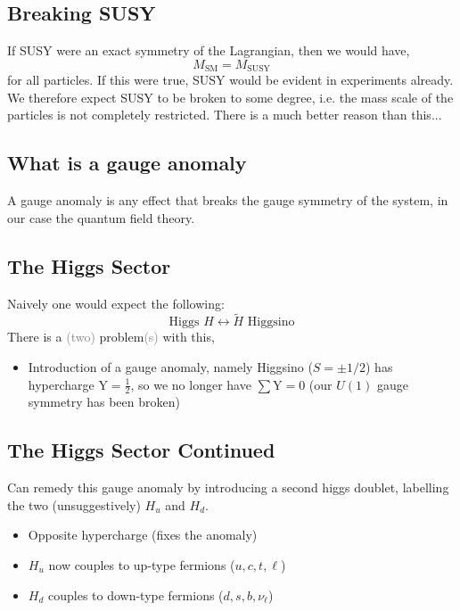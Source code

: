 \documentclass{beamer}
\begin{document}
  
\subsection{Breaking SUSY}
\begin{frame}{\insertsubsection}
  If SUSY were an exact symmetry of the Lagrangian, then we would have,
  \begin{equation*}
    M_{\textrm{SM}}=M_{\textrm{SUSY}}
  \end{equation*}
  for all particles. If this were true, SUSY would be evident in experiments
  already.  We therefore expect SUSY to be broken to some degree, i.e. the mass
  scale of the particles is not completely restricted.
\alert{There is a much better reason than this...}
\end{frame}

\subsection{What is a gauge anomaly}
\begin{frame}{\insertsubsection}
  \begin{definition}
  A gauge anomaly is \alert{any} effect that breaks the gauge symmetry of the system, in our case the
  quantum field theory.
  \end{definition}
\end{frame}

\subsection{The Higgs Sector}
\begin{frame}{\insertsubsection}
  Naively one would expect the following:
  \begin{equation*}
    \textrm{Higgs } H \leftrightarrow \tilde{H}\textrm{ Higgsino} 
  \end{equation*}
  There is a \textcolor{gray}{(two)} problem\textcolor{gray}{(s)} with this,
  \begin{itemize}
    \item Introduction of a gauge anomaly, namely Higgsino ($S=\pm1/2$) has hypercharge
    $\textrm{Y}=\frac{1}{2}$, so we no longer have $\sum\textrm{Y}=0$ (our
    $U(1)$ gauge symmetry has been broken)
  \end{itemize}
\end{frame}

\subsection{The Higgs Sector Continued}
\begin{frame}{\insertsubsection}
  Can remedy this gauge anomaly by introducing a second higgs doublet, labelling
  the two (unsuggestively) $H_{u}$ and $H_{d}$.
  \begin{itemize}
    \item Opposite hypercharge (fixes the anomaly)
    \item $H_{u}$ now couples to up-type fermions ($u,c,t,\ell$)
    \item $H_{d}$ couples to down-type fermions ($d,s,b,\nu_{\ell}$)
  \end{itemize}
\end{frame}
\end{document}
